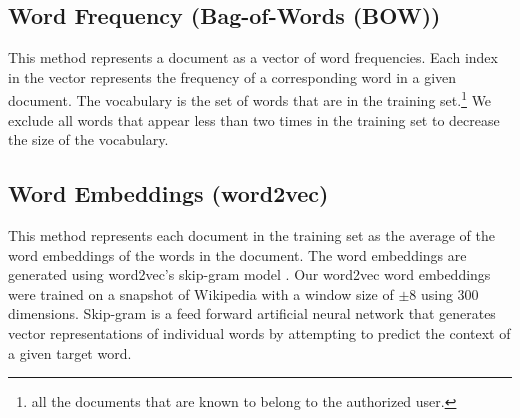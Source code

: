 \documentclass[11pt]{article}
\begin{document}
\subsection{Word Frequency (Bag-of-Words (BOW))}
This method represents a document as a vector of word frequencies. Each index in the vector represents the frequency of a corresponding word in a given document. The vocabulary is the set of words that are in the training set.\footnote{all the documents that are known to belong to the authorized user.} We exclude all words that appear less than two times in the training set to decrease the size of the vocabulary. 

\subsection{Word Embeddings (word2vec)}
This method represents each document in the training set as the average of the word embeddings of the words in the document. The word embeddings are generated using word2vec's skip-gram model \cite{Mikolov+:2013b}. Our word2vec word embeddings were
trained on a snapshot of Wikipedia with a window size of $\pm8$ using $300$ dimensions. Skip-gram is a feed forward artificial neural network that generates vector representations of individual words by attempting to predict the context of a given target word.

\end{document}
